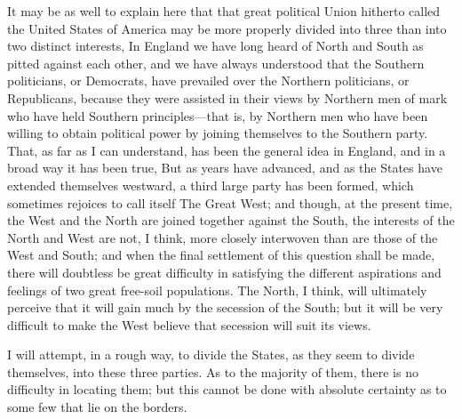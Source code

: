 It may be as well to explain here that that great political Union
hitherto called the United States of America may be more properly
divided into three than into two distinct interests, In England we
have long heard of North and South as pitted against each other,
and we have always understood that the Southern politicians, or
Democrats, have prevailed over the Northern politicians, or
Republicans, because they were assisted in their views by Northern
men of mark who have held Southern principles---that is, by Northern
men who have been willing to obtain political power by joining
themselves to the Southern party.  That, as far as I can
understand, has been the general idea in England, and in a broad
way it has been true, But as years have advanced, and as the States
have extended themselves westward, a third large party has been
formed, which sometimes rejoices to call itself The Great West; and
though, at the present time, the West and the North are joined
together against the South, the interests of the North and West are
not, I think, more closely interwoven than are those of the West
and South; and when the final settlement of this question shall be
made, there will doubtless be great difficulty in satisfying the
different aspirations and feelings of two great free-soil
populations.  The North, I think, will ultimately perceive that it
will gain much by the secession of the South; but it will be very
difficult to make the West believe that secession will suit its
views.

I will attempt, in a rough way, to divide the States, as they seem
to divide themselves, into these three parties.  As to the majority
of them, there is no difficulty in locating them; but this cannot
be done with absolute certainty as to some few that lie on the
borders.

